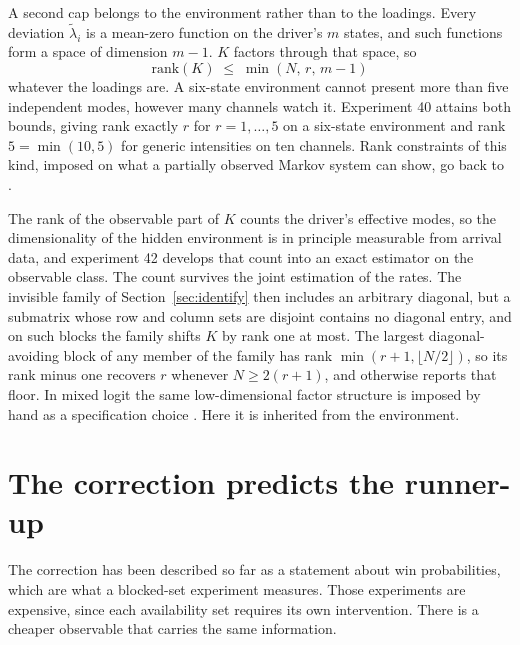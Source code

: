 \documentclass[11pt]{article}
\theoremstyle{remark}
\begin{document}
A second cap belongs to the environment rather than to the loadings. Every
deviation $\tilde\lambda_i$ is a mean-zero function on the driver's $m$
states, and such functions form a space of dimension $m - 1$. $K$ factors
through that space, so
\[
  \mathrm{rank}(K) \;\le\; \min(N,\, r,\, m-1)
\]
whatever the loadings are. A six-state environment cannot present more than
five independent modes, however many channels watch it. Experiment 40 attains
both bounds, giving rank exactly $r$ for $r = 1, \dots, 5$ on a six-state
environment and rank $5 = \min(10, 5)$ for generic intensities on ten
channels. Rank constraints of this kind, imposed on what a partially observed
Markov system can show, go back to \citet{fredkin1986}.

The rank of the observable part of $K$ counts the driver's effective modes, so the dimensionality of the
hidden environment is in principle measurable from arrival data, and
experiment 42 develops that count into an exact estimator on the observable
class. The count survives the joint estimation of the rates. The invisible
family of Section~\ref{sec:identify} then includes an arbitrary diagonal,
but a submatrix whose row and column sets are disjoint contains no diagonal
entry, and on such blocks the family shifts $K$ by rank one at most. The
largest diagonal-avoiding block of any member of the family has rank
$\min(r+1, \lfloor N/2 \rfloor)$, so its rank minus one recovers $r$
whenever $N \ge 2(r+1)$, and otherwise reports that floor. In mixed logit the same low-dimensional factor structure is imposed by
hand as a specification choice \citep{mcfadden2000}. Here it is inherited
from the environment.

\section{The correction predicts the runner-up}\label{sec:runnerup}

The correction has been described so far as a statement about win
probabilities, which are what a blocked-set experiment measures. Those
experiments are expensive, since each availability set requires its own
intervention. There is a cheaper observable that carries the same information.
\end{document}
